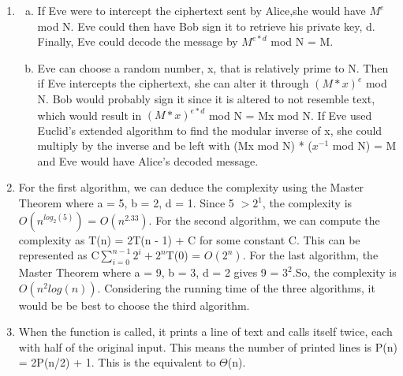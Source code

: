 \documentclass{article}
\begin{document}
\begin{enumerate}
	\item \begin{enumerate}[(a)]
		\item If Eve were to intercept the ciphertext sent by Alice,she would have $M^{e}$ mod N. Eve could then have Bob sign it to retrieve his private key, d.
		Finally, Eve could decode the message by $M^{e * d}$ mod N = M.
		\item Eve can choose a random number, x, that is relatively prime to N. Then if Eve intercepts the ciphertext, she can alter it through $(M * x)^{e}$ mod N.
		Bob would probably sign it since it is altered to not resemble text, which would result in $(M * x)^{e * d}$ mod N = Mx mod N. If Eve used Euclid's extended
		algorithm to find the modular inverse of x, she could multiply by the inverse and be left with (Mx mod N) * ($x^{-1}$ mod N) = M and Eve would have Alice's decoded message.
	\end{enumerate}

	\item For the first algorithm, we can deduce the complexity using the Master Theorem where a = 5, b = 2, d = 1. Since 5 $ > 2^{1}$, the complexity is $O(n^{log_{2}(5)})$ = $O(n^{2.33})$.
	For the second algorithm, we can compute the complexity as T(n) = 2T(n - 1) + C for some constant C. This can be represented as C$\sum\limits_{i=0}^{n-1} 2^{i} + 2^{n}$T(0) = $O(2^{n})$.
	For the last algorithm, the Master Theorem where a = 9, b = 3, d = 2 gives 9 = $3^{2}$.So, the complexity is $O(n^{2}log(n))$. Considering the running time of the three algorithms, it would
	be be best to choose the third algorithm.

    \item When the function is called, it prints a line of text and calls itself twice, each with half of the original input. This means the number of printed lines is P(n) = 2P(n/2) + 1.
    This is the equivalent to $\Theta$(n).

    \clearpage


\end{enumerate}
\end{document}
